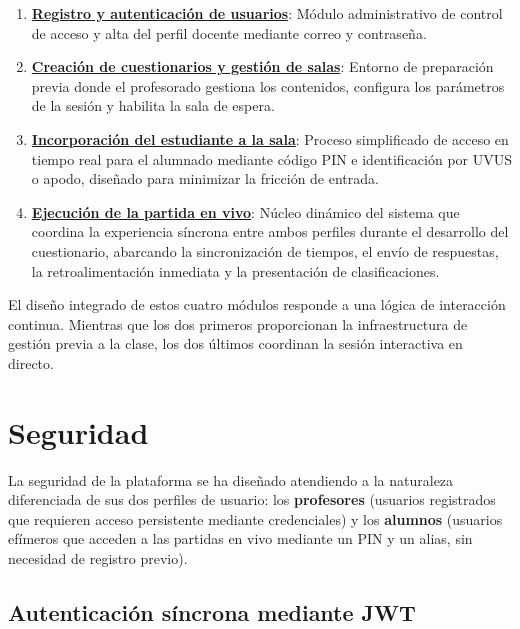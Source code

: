 \begin{enumerate}
    \item \textbf{\hyperref[anexo:flujo_registro_autenticacion]{Registro y autenticación de usuarios}}: Módulo administrativo de control de acceso y alta del perfil docente mediante correo y contraseña.
    \item \textbf{\hyperref[anexo:flujo_creacion_cuestionarios_gestion_salas]{Creación de cuestionarios y gestión de salas}}: Entorno de preparación previa donde el profesorado gestiona los contenidos, configura los parámetros de la sesión y habilita la sala de espera.
    \item \textbf{\hyperref[anexo:flujo_incorporacion_estudiante_sala]{Incorporación del estudiante a la sala}}: Proceso simplificado de acceso en tiempo real para el alumnado mediante código PIN e identificación por UVUS o apodo, diseñado para minimizar la fricción de entrada.
    \item \textbf{\hyperref[anexo:flujo_ejecucion_partida_vivo]{Ejecución de la partida en vivo}}: Núcleo dinámico del sistema que coordina la experiencia síncrona entre ambos perfiles durante el desarrollo del cuestionario, abarcando la sincronización de tiempos, el envío de respuestas, la retroalimentación inmediata y la presentación de clasificaciones.
\end{enumerate}

El diseño integrado de estos cuatro módulos responde a una lógica de interacción continua. Mientras que los dos primeros proporcionan la infraestructura de gestión previa a la clase, los dos últimos coordinan la sesión interactiva en directo.

\section{Seguridad}
\label{sec:seguridad}

La seguridad de la plataforma se ha diseñado atendiendo a la naturaleza diferenciada de sus dos perfiles de usuario: los \textbf{profesores} (usuarios registrados que requieren acceso persistente mediante credenciales) y los \textbf{alumnos} (usuarios efímeros que acceden a las partidas en vivo mediante un PIN y un alias, sin necesidad de registro previo).

\subsection{Autenticación síncrona mediante JWT}
\label{sec:autenticacion_jwt}

